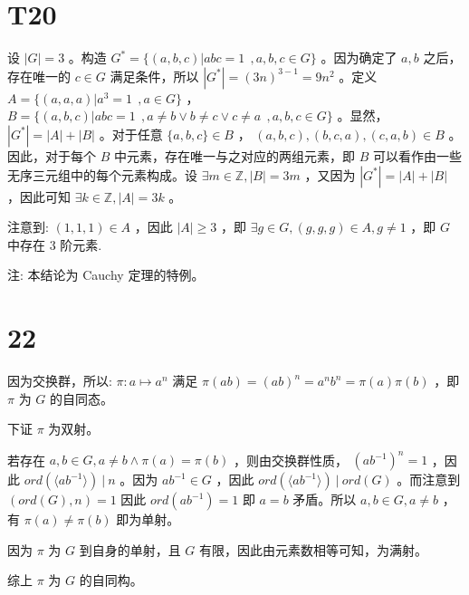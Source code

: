 \documentclass[fontset=windows]{article}
\begin{document}
\section*{T20}

设 $|G| = 3$ 。构造 $G^* = \{(a,b,c) | abc = 1~\ , a,b,c \in G\}$ 。因为确定了 $a,b$ 之后，存在唯一的 $c \in G$ 满足条件，所以 $|G^*| = (3n)^{3 - 1} = 9n^2$ 。定义 $A = \{(a,a,a) | a^3 = 1~\ , a \in G\}$ ， $B = \{(a,b,c) | abc = 1 ~\ , a \ne b \vee b \ne c \vee c \ne a ~\ , a,b,c \in G\}$ 。显然， $|G^*| = |A| + |B|$ 。对于任意 $\{a,b,c\} \in B$ ， $(a,b,c),(b,c,a),(c,a,b) \in B$ 。因此，对于每个 $B$ 中元素，存在唯一与之对应的两组元素，即 $B$ 可以看作由一些无序三元组中的每个元素构成。设 $\exists m \in \mathbb{Z},|B| = 3m $ ，又因为 $|G^*| = |A| + |B|$ ，因此可知 $\exists k \in \mathbb{Z},|A| = 3k$ 。

注意到: $(1,1,1) \in A$ ，因此 $|A| \ge 3$ ，即 $\exists g \in G, (g,g,g) \in A, g \ne 1$ ，即 $G$ 中存在 $3$ 阶元素.

注: 本结论为 Cauchy 定理的特例。

\section*{22}

因为交换群，所以: $\pi: a \mapsto a^n$ 满足 $\pi(ab) = (ab)^n = a^n b^n = \pi(a) \pi(b)$ ，即 $\pi$ 为 $G$ 的自同态。

下证 $\pi$ 为双射。

若存在 $a,b \in G, a\ne b \wedge \pi(a) = \pi(b)$ ，则由交换群性质， $(ab^{-1})^n = 1$ ，因此 $ord(\langle ab^{-1} \rangle)\ |\ n$ 。因为 $ab^{-1} \in G$ ，因此 $ord(\langle ab^{-1} \rangle)\ |\ ord(G)$ 。而注意到 $(ord(G),n) = 1$ 因此 $ord(ab^{-1}) = 1$ 即 $a=b$ 矛盾。所以 $a,b \in G, a\ne b$ ，有 $\pi(a) \ne \pi(b)$ 即为单射。

因为 $\pi$ 为 $G$ 到自身的单射，且 $G$ 有限，因此由元素数相等可知，为满射。

综上 $\pi$ 为 $G$ 的自同构。
\end{document}
